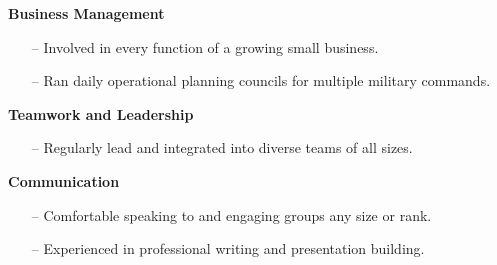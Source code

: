 {\sc \textbf{Business Management}}
\begin{itemize}[leftmargin=*]
\item[--] Involved in every function of a growing small business.
\item[--] Ran daily operational planning councils for multiple military commands.
\end{itemize}

{\sc \textbf{Teamwork and Leadership}}
\begin{itemize}[leftmargin=*]
\item[--] Regularly lead and integrated into diverse teams of all sizes.
\end{itemize}

{\sc \textbf{Communication}}
\begin{itemize}[leftmargin=*]
\item[--] Comfortable speaking to and engaging groups any size or rank.
\item[--] Experienced in professional writing and presentation building.
\end{itemize}
